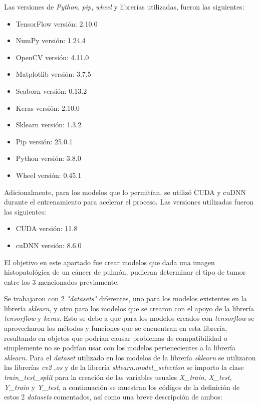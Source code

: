 Las versiones de \textit{Python}, \textit{pip}, \textit{wheel} y librerías utilizadas, fueron las siguientes:

\begin{itemize}
    \item TensorFlow versión: 2.10.0
    \item NumPy versión: 1.24.4
    \item OpenCV versión: 4.11.0
    \item Matplotlib versión: 3.7.5
    \item Seaborn versión: 0.13.2
    \item Keras versión: 2.10.0
    \item Sklearn versión: 1.3.2
    \item Pip versión: 25.0.1
    \item Python versión: 3.8.0
    \item Wheel versión: 0.45.1
\end{itemize}

Adicionalmente, para los modelos que lo permitían, se utilizó CUDA y cuDNN durante el entrenamiento para acelerar el proceso. Las versiones utilizadas fueron las siguientes:

\begin{itemize}
    \item CUDA versión: 11.8
    \item cuDNN versión: 8.6.0
\end{itemize}

El objetivo en este apartado fue crear modelos que dada una imagen histopatológica de un cáncer de pulmón, pudieran determinar el tipo de tumor entre los 3 mencionados previamente.

Se trabajaron con 2 \textit{"datasets"} diferentes, uno para los modelos existentes en la librería \textit{sklearn}, y otro para los modelos que se crearon con el apoyo de la librería \textit{tensorflow} y \textit{keras}. Esto se debe a que para los modelos creados con \textit{tensorflow} se aprovecharon los métodos y funciones que se encuentran en esta librería, resultando en objetos que podrían causar problemas de compatibilidad o simplemente no se podrían usar con los modelos pertenecientes a la librería \textit{sklearn}. Para el \textit{dataset} utilizado en los modelos de la librería \textit{sklearn} se utilizaron las librerías \textit{cv2} ,\textit{os} y de la librería \textit{sklearn.model\_selection} se importo la clase \textit{train\_test\_split} para la creación de las variables usuales \textit{X\_train}, \textit{X\_test}, \textit{Y\_train} y \textit{Y\_test}, a continuación se muestran los códigos de la definición de estos 2 \textit{datasets} comentados, así como una breve descripción de ambos:\\

